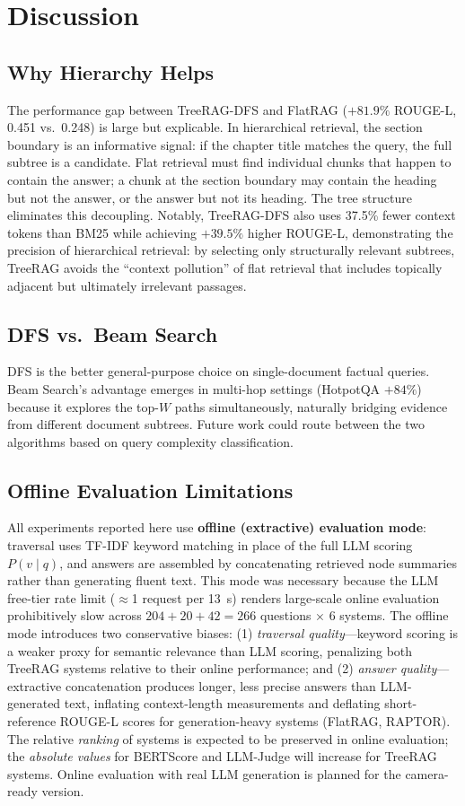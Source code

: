 \documentclass[sigconf,review,anonymous]{acmart}
\begin{document}
\section{Discussion}
\label{sec:discussion}

\subsection{Why Hierarchy Helps}
The performance gap between TreeRAG-DFS and FlatRAG ($+81.9\%$ ROUGE-L, 0.451
vs.\ 0.248) is large but explicable. In hierarchical retrieval, the section
boundary is an informative signal: if the chapter title matches the query, the
full subtree is a candidate. Flat retrieval must find individual chunks that
happen to contain the answer; a chunk at the section boundary may contain the
heading but not the answer, or the answer but not its heading. The tree structure
eliminates this decoupling. Notably, TreeRAG-DFS also uses 37.5\% fewer context
tokens than BM25 while achieving $+39.5\%$ higher ROUGE-L, demonstrating the
precision of hierarchical retrieval: by selecting only structurally relevant
subtrees, TreeRAG avoids the ``context pollution'' of flat retrieval that
includes topically adjacent but ultimately irrelevant passages.

\subsection{DFS vs.\ Beam Search}
DFS is the better general-purpose choice on single-document factual queries. Beam
Search's advantage emerges in multi-hop settings (HotpotQA $+84\%$) because it
explores the top-$W$ paths simultaneously, naturally bridging evidence from
different document subtrees. Future work could route between the two algorithms
based on query complexity classification.

\subsection{Offline Evaluation Limitations}
All experiments reported here use \textbf{offline (extractive) evaluation mode}:
traversal uses TF-IDF keyword matching in place of the full LLM scoring
$P(v\mid q)$, and answers are assembled by concatenating retrieved node summaries
rather than generating fluent text. This mode was necessary because the LLM
free-tier rate limit ($\approx$1 request per 13~s) renders large-scale online
evaluation prohibitively slow across $204+20+42=266$ questions $\times$ 6 systems.
The offline mode introduces two conservative biases: (1) \emph{traversal
quality}---keyword scoring is a weaker proxy for semantic relevance than LLM
scoring, penalizing both TreeRAG systems relative to their online performance;
and (2) \emph{answer quality}---extractive concatenation produces longer, less
precise answers than LLM-generated text, inflating context-length measurements
and deflating short-reference ROUGE-L scores for generation-heavy systems
(FlatRAG, RAPTOR). The relative \emph{ranking} of systems is expected to be
preserved in online evaluation; the \emph{absolute values} for BERTScore and
LLM-Judge will increase for TreeRAG systems. Online evaluation with real LLM
generation is planned for the camera-ready version.
\end{document}

